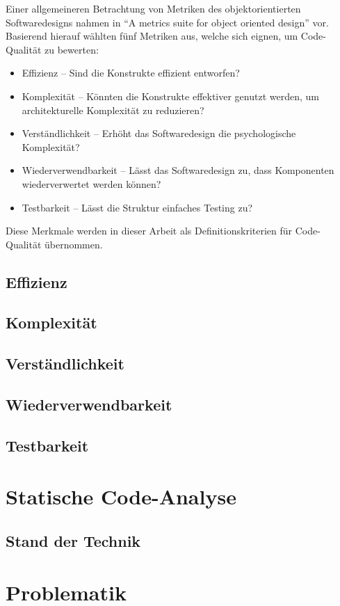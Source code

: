 \documentclass[a4paper, 12pt]{article}
\begin{document}
Einer allgemeineren Betrachtung von Metriken des objektorientierten Softwaredesigns nahmen \textcite{Metrics_OO_design} in \enquote{A metrics suite for object oriented design} vor.
Basierend hierauf wählten \textcite{Linda_softwarequality} fünf Metriken aus, welche sich eignen, um Code-Qualität zu bewerten:
\begin{itemize}
    \item Effizienz -- Sind die Konstrukte effizient entworfen?
    \item Komplexität -- Könnten die Konstrukte effektiver genutzt werden, um architekturelle Komplexität zu reduzieren?
    \item Verständlichkeit -- Erhöht das Softwaredesign die psychologische Komplexität?
    \item Wiederverwendbarkeit -- Lässt das Softwaredesign zu, dass Komponenten wiederverwertet werden können?
    \item Testbarkeit -- Lässt die Struktur einfaches Testing zu?
\end{itemize}
Diese Merkmale werden in dieser Arbeit als Definitionskriterien für Code-Qualität übernommen.

\subsection{Effizienz}
\blindtext
\subsection{Komplexität}
\blindtext
\subsection{Verständlichkeit}
\blindtext
\subsection{Wiederverwendbarkeit}
\blindtext
\subsection{Testbarkeit}
\blindtext

\section{Statische Code-Analyse}
\subsection{Stand der Technik}
\blindtext

\section{Problematik}
\blindtext

\newpage
\printbibliography
\end{document}
